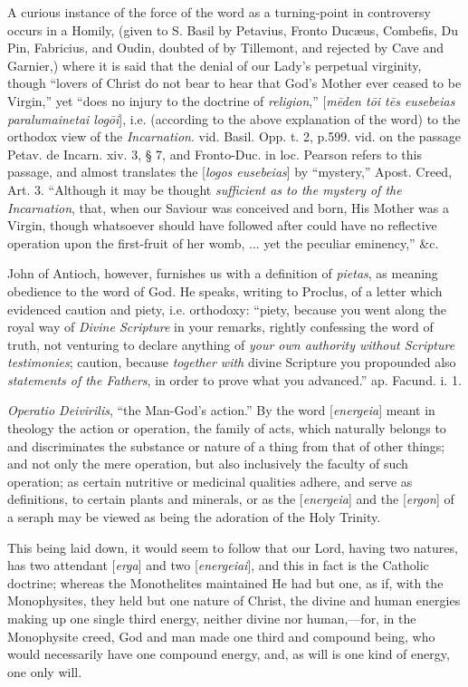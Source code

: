 A curious instance of the force of the word as a
turning-point in controversy occurs in a Homily, (given to S. Basil by
Petavius, Fronto Ducæus, Combefis, Du Pin, Fabricius, and Oudin,
doubted of by Tillemont, and rejected by Cave and Garnier,) where it
is said that the denial of our Lady's perpetual virginity, though ``lovers
of Christ do not bear to hear that God's Mother ever ceased to be
Virgin,'' yet ``does no injury to the doctrine of \emph{religion},'' [\emph{m\={e}den
t\={o}i t\={e}s eusebeias paralumainetai log\={o}i}], i.e.
(according to the above explanation of the word) to the orthodox view
of the \emph{Incarnation}. vid. Basil. Opp. t. 2, p.599. vid. on the
passage Petav. de Incarn. xiv. 3, § 7, and Fronto-Duc. in loc.
Pearson refers to this passage, and almost translates the [\emph{logos
eusebeias}] by ``mystery,'' Apost. Creed, Art. 3. ``Although it may be
thought \emph{sufficient as to the mystery of the Incarnation}, that,
when our Saviour was conceived and born, His Mother was a Virgin,
though whatsoever should have followed after could have no reflective
operation upon the first-fruit of her womb, ... yet the peculiar
eminency,'' \&c.

John of Antioch, however, furnishes us with a
definition of \emph{pietas}, as meaning obedience to the word of God.
He speaks, writing to Proclus, of a letter which evidenced caution and
piety, i.e. orthodoxy: ``piety, because you went along the royal way of
\emph{Divine Scripture} in your remarks, rightly confessing the word
of truth, not venturing to declare anything of \emph{your own authority
without Scripture testimonies}; caution, because \emph{together with}
divine Scripture you propounded also \emph{statements of the Fathers},
in order to prove what you advanced.'' ap. Facund. i. 1.


\emph{Operatio Deivirilis}, ``the Man-God's
action.'' By the word [\emph{energeia}] meant in theology the action or
operation, the family of acts, which naturally belongs to and
discriminates the substance or nature of a thing from that of other
things; and not only the mere operation, but also inclusively the
faculty of such operation; as certain nutritive or medicinal qualities
adhere, and serve as definitions, to certain plants and minerals, or
as the [\emph{energeia}] and the [\emph{ergon}] of a seraph may be
viewed as being the adoration of the Holy Trinity.

This being laid down, it would seem to follow
that our Lord, having two natures, has two attendant [\emph{erga}] and
two [\emph{energeiai}], and this in fact is the Catholic doctrine;
whereas the Monothelites maintained He had but one, as if, with the
Monophysites, they held but one nature of Christ, the divine and human
energies making up one single third energy, neither divine nor
human,—for, in the Monophysite creed, God and man made one third and
compound being, who would necessarily have one compound energy, and,
as will is one kind of energy, one only will.

